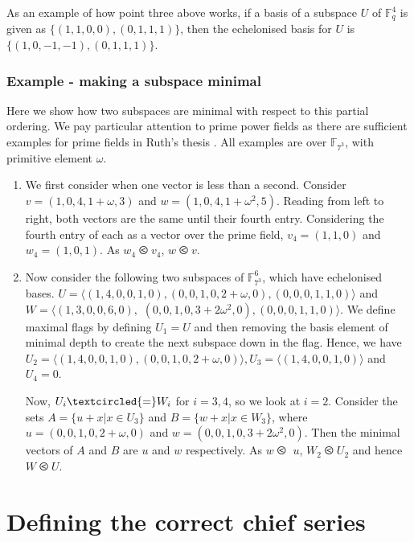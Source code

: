 \documentclass[12pt]{report}
\begin{document}
As an example of how point three above works, if a basis of a subspace $U$ of $\mathbb{F}_{q}^4$ is given as $\{ (1, 1, 0, 0), (0, 1, 1, 1) \}$, then the echelonised basis for $U$ is $\{ (1, 0, -1, -1), (0, 1, 1, 1) \}$.

\subsubsection{Example - making a subspace minimal}

Here we show how two subspaces are minimal with respect to this partial ordering. We pay particular attention to prime power fields as there are sufficient examples for prime fields in Ruth's thesis \cite{Ruth}. All examples are over $\mathbb{F}_{7^3}$, with primitive element $\omega$.

\begin{enumerate}
\item We first consider when one vector is less than a second. Consider $v = (1, 0, 4, 1+\omega, 3)$ and $w = (1, 0, 4, 1+\omega^2, 5)$. Reading from left to right, both vectors are the same until their fourth entry. Considering the fourth entry of each as a vector over the prime field, $v_4 = (1, 1, 0)$ and $w_4 = (1, 0, 1)$. As $w_4 \olessthan v_4$, $w \olessthan v$.

\item Now consider the following two subspaces of $\mathbb{F}^6_{7^3}$, which have echelonised bases. $U = \langle (1, 4, 0, 0, 1, 0), (0, 0, 1, 0, 2+\omega, 0), (0, 0, 0, 1, 1, 0) \rangle$ and $W = \langle (1, 3, 0, 0, 6, 0),$ $(0, 0, 1, 0, 3+2\omega^2, 0), (0, 0, 0, 1, 1, 0) \rangle$. We define maximal flags by defining $U_1 = U$ and then removing the basis element of minimal depth to create the next subspace down in the flag. Hence, we have $U_2 = \langle (1, 4, 0, 0, 1, 0), (0, 0, 1, 0, 2+\omega, 0) \rangle, U_3 = \langle (1, 4, 0, 0, 1, 0) \rangle$ and $U_4 = 0$.

Now, $U_i \textcircled{=} W_i$ for $i = 3, 4$, so we look at $i = 2$. Consider the sets $A = \{u+x| x \in U_3\}$ and $B = \{w+x| x \in W_3\}$, where $u = (0, 0, 1, 0, 2+\omega, 0)$ and $w = (0, 0, 1, 0, 3+2\omega^2, 0)$. Then the minimal vectors of $A$ and $B$ are $u$ and $w$ respectively. As $w \olessthan$ $u$, $W_2 \olessthan U_2$ and hence $W \olessthan U$.
\end{enumerate}

\section{Defining the correct chief series}
\end{document}
